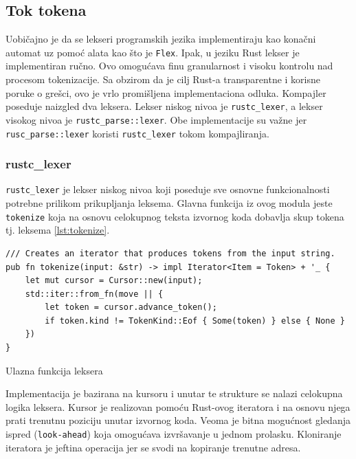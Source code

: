 \documentclass[11pt]{article}
\begin{document}
\subsection{Tok tokena}

Uobičajno je da se lekseri programskih jezika implementiraju kao konačni automat uz pomoć alata kao što je
\verb|Flex|. Ipak, u jeziku Rust lekser je implementiran ručno. Ovo omogućava finu granularnost i visoku 
kontrolu nad procesom tokenizacije. Sa obzirom da je cilj Rust-a transparentne i korisne poruke o 
grešci, ovo je vrlo promišljena implementaciona odluka.
Kompajler poseduje naizgled dva leksera. Lekser niskog nivoa je \verb|rustc_lexer|, a lekser visokog nivoa je \verb|rustc_parse::lexer|. 
Obe implementacije su važne jer \verb|rusc_parse::lexer| koristi \verb|rustc_lexer| tokom kompajliranja.

\subsubsection{rustc\_lexer}

\verb|rustc_lexer| je lekser niskog nivoa koji poseduje sve osnovne
funkcionalnosti potrebne prilikom prikupljanja leksema.
Glavna funkcija iz ovog modula jeste \verb|tokenize| koja na osnovu celokupnog teksta 
izvornog koda dobavlja skup tokena tj. leksema \ref{lst:tokenize}.

\begin{listing}[H]
\begin{verbatim}
/// Creates an iterator that produces tokens from the input string.
pub fn tokenize(input: &str) -> impl Iterator<Item = Token> + '_ {
    let mut cursor = Cursor::new(input);
    std::iter::from_fn(move || {
        let token = cursor.advance_token();
        if token.kind != TokenKind::Eof { Some(token) } else { None }
    })
}
\end{verbatim}
\caption{Ulazna funkcija leksera}
\label{lst:tokenize}
\end{listing}

Implementacija je bazirana na kursoru i unutar te strukture se nalazi celokupna logika leksera. 
Kursor je realizovan pomoću Rust-ovog iteratora i na osnovu njega prati trenutnu poziciju 
unutar izvornog koda. Veoma je bitna mogućnost gledanja ispred (\verb|look-ahead|) koja omogućava 
izvršavanje u jednom prolasku.
Kloniranje iteratora je jeftina operacija jer se svodi na kopiranje trenutne adresa.
\end{document}
